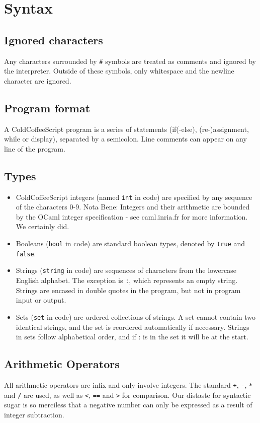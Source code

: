 \documentclass{article}
\begin{document}
\section{Syntax}
\subsection{Ignored characters}
Any characters surrounded by \lstinline|#| symbols are treated as comments and ignored by the interpreter. Outside of these symbols, only whitespace and the newline character are ignored.
\subsection{Program format}
A ColdCoffeeScript program is a series of statements (if(-else), (re-)assignment, while or display), separated by a semicolon. Line comments can appear on any line of the program.
\subsection{Types}
\begin{itemize}
\item ColdCoffeeScript integers (named \lstinline|int| in code) are specified by any sequence of the characters 0-9. Nota Bene: Integers and their arithmetic are bounded by the OCaml integer specification - see caml.inria.fr for more information. We certainly did.
\item Booleans (\lstinline|bool| in code) are standard boolean types, denoted by \lstinline|true| and \lstinline|false|.
\item Strings (\lstinline|string| in code) are sequences of characters from the lowercase English alphabet. The exception is \lstinline|:|, which represents an empty string. Strings are encased in double quotes in the program, but not in program input or output.
\item Sets (\lstinline|set| in code) are ordered collections of strings. A set cannot contain two identical strings, and the set is reordered automatically if necessary. Strings in sets follow alphabetical order, and if : is in the set it will be at the start.
\end{itemize}
\subsection{Arithmetic Operators}
All arithmetic operators are infix and only involve integers. The standard \lstinline|+|, \lstinline|-|, \lstinline|*| and \lstinline|/| are used, as well as \lstinline|<|, \lstinline|==| and \lstinline|>| for comparison. Our distaste for syntactic sugar is so merciless that a negative number can only be expressed as a result of integer subtraction.
\end{document}
